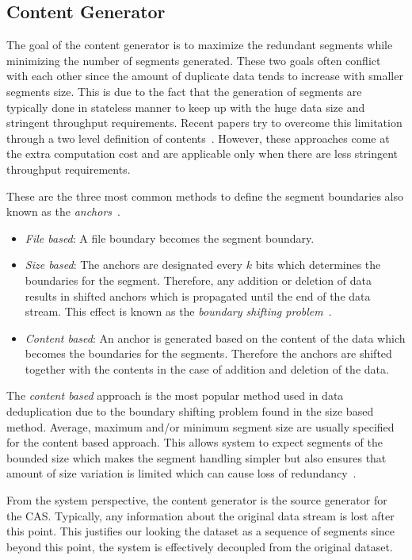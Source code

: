 \subsection{Content Generator}
The goal of the content generator is to maximize the redundant segments while minimizing the number of segments generated.
These two goals often conflict with each other since the amount of duplicate data tends to increase with smaller segments size.
This is due to the fact that the generation of segments are typically done in stateless manner to keep up with the huge data size and stringent throughput requirements.
Recent papers try to overcome this limitation through a two level definition of contents~\cite{kruus:2010, bobbarjung:2006}.
However, these approaches come at the extra computation cost and are applicable only when there are less stringent throughput requirements.

These are the three most common methods to define the segment boundaries also known as the \emph{anchors}~\cite{zhu:2008, muthitacharoen:2001}.
\begin{itemize}
  \item \emph{File based}: A file boundary becomes the segment boundary.
  \item \emph{Size based}: The anchors are designated every $k$ bits which determines the boundaries for the segment. Therefore, any addition or deletion of data results in shifted anchors which is propagated until the end of the data stream. This effect is known as the \emph{boundary shifting problem}~\cite{muthitacharoen:2001}.
  \item \emph{Content based}: An anchor is generated based on the content of the data which becomes the boundaries for the segments. Therefore the anchors are shifted together with the contents in the case of addition and deletion of the data.
\end{itemize}

The \emph{content based} approach is the most popular method used in data deduplication due to the boundary shifting problem found in the size based method.
Average, maximum and/or minimum segment size are usually specified for the content based approach. This allows system to expect segments of the bounded size which makes the segment handling simpler but also ensures that amount of size variation is limited which can cause loss of redundancy~\cite{eshghi:2005}.

From the system perspective, the content generator is the source generator for the CAS. Typically, any information about the original data stream is lost after this point. This justifies our looking the dataset as a sequence of segments since beyond this point, the system is effectively decoupled from the original dataset.

